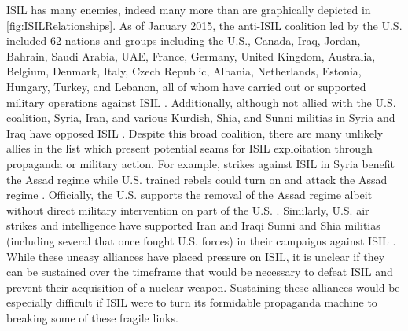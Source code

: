 \documentclass{report}
\begin{document}
ISIL has many enemies, indeed many more than are graphically depicted in \autoref{fig:ISILRelationships}.  As of January 2015, the anti-ISIL coalition led by the U.S. included 62 nations and groups including the U.S., Canada, Iraq, Jordan, Bahrain, Saudi Arabia, UAE, France, Germany, United Kingdom, Australia, Belgium, Denmark, Italy, Czech Republic, Albania, Netherlands, Estonia, Hungary, Turkey, and Lebanon, all of whom have carried out or supported military operations against ISIL \cite{Wordsworth2015}.  Additionally, although not allied with the U.S. coalition, Syria, Iran, and various Kurdish, Shia, and Sunni militias in Syria and Iraq have opposed ISIL \cite{Mooney2014}.  Despite this broad coalition, there are many unlikely allies in the list which present potential seams for ISIL exploitation  through propaganda or military action.  For example, strikes against ISIL in Syria benefit the Assad regime while U.S. trained rebels could turn on and attack the Assad regime \cite{Shinkman2015}.  Officially, the U.S. supports the removal of the Assad regime albeit without direct military intervention on part of the U.S. \cite{Shinkman2015}.  Similarly, U.S. air strikes and intelligence have supported Iran and Iraqi Sunni and Shia militias (including several that once fought U.S. forces) in their campaigns against ISIL \cite{Chulov2014}.  While these uneasy alliances have placed pressure on ISIL, it is unclear if they can be sustained over the timeframe that would be necessary to defeat ISIL and prevent their acquisition of a nuclear weapon. Sustaining these alliances would be especially difficult if ISIL were to turn its formidable propaganda machine to breaking some of these fragile links.
\end{document}
